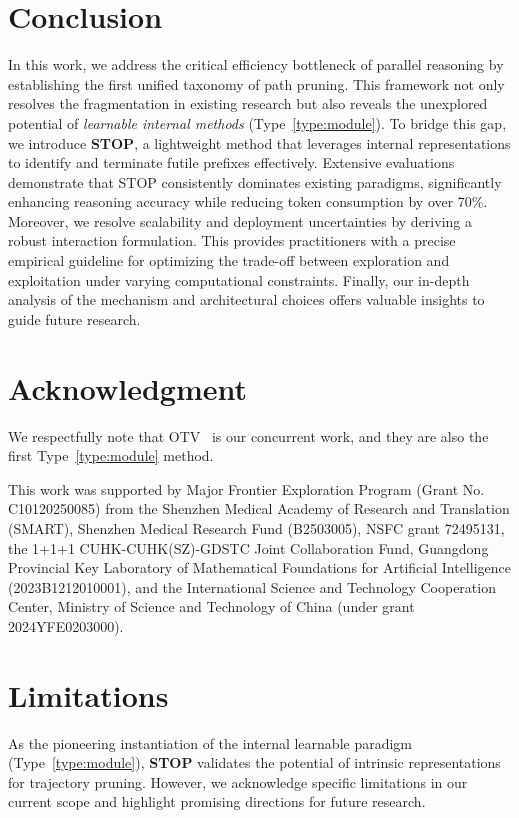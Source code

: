 \documentclass[11pt]{article}
\theoremstyle{plain}
\begin{document}
\section{Conclusion}
In this work, we address the critical efficiency bottleneck of parallel reasoning by establishing the first unified taxonomy of path pruning. 
This framework not only resolves the fragmentation in existing research but also reveals the unexplored potential of \textit{learnable internal methods} (Type~\ref{type:module}). 
To bridge this gap, we introduce \textbf{STOP}, a lightweight method that leverages internal representations to identify and terminate futile prefixes effectively. 
Extensive evaluations demonstrate that STOP consistently dominates existing paradigms, significantly enhancing reasoning accuracy while reducing token consumption by over 70\%.
Moreover, we resolve scalability and deployment uncertainties by deriving a robust interaction formulation. 
This provides practitioners with a precise empirical guideline for optimizing the trade-off between exploration and exploitation under varying computational constraints.
Finally, our in-depth analysis of the mechanism and architectural choices offers valuable insights to guide future research.

\section*{Acknowledgment}
We respectfully note that OTV~\cite{zhuang2026one} is our concurrent work, and they are also the first Type~\ref{type:module} method.

This work was supported by Major Frontier Exploration Program (Grant No. C10120250085) from the Shenzhen Medical Academy of Research and Translation (SMART),  Shenzhen Medical Research Fund (B2503005),  NSFC grant 72495131, the 1+1+1 CUHK-CUHK(SZ)-GDSTC Joint Collaboration Fund, Guangdong Provincial Key Laboratory of Mathematical Foundations for Artificial Intelligence (2023B1212010001), and the International Science and Technology Cooperation Center, Ministry of Science and Technology of China (under grant 2024YFE0203000).

\section*{Limitations}
As the pioneering instantiation of the internal learnable paradigm (Type~\ref{type:module}), \textbf{STOP} validates the potential of intrinsic representations for trajectory pruning. 
However, we acknowledge specific limitations in our current scope and highlight promising directions for future research.
\end{document}
